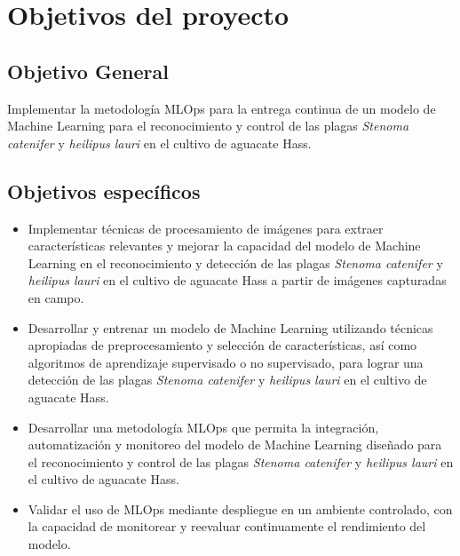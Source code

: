 \section{Objetivos del proyecto}

\subsection{Objetivo General}
Implementar la metodología MLOps para la entrega continua de un modelo de Machine Learning para el reconocimiento y control de las plagas \textit{Stenoma catenifer} y \textit{heilipus lauri} en el cultivo de aguacate Hass.




\subsection{Objetivos específicos}
\begin{itemize}
  \item Implementar técnicas de procesamiento de imágenes para extraer características relevantes y mejorar la capacidad del modelo de Machine Learning en el reconocimiento y detección de las plagas \textit{Stenoma catenifer} y \textit{heilipus lauri} en el cultivo de aguacate Hass a partir de imágenes capturadas en campo.
  \item Desarrollar y entrenar un modelo de Machine Learning utilizando técnicas apropiadas de preprocesamiento y selección de características, así como algoritmos de aprendizaje supervisado o no supervisado, para lograr una detección de las plagas \textit{Stenoma catenifer} y \textit{heilipus lauri} en el cultivo de aguacate Hass.
  \item Desarrollar una metodología MLOps que permita la integración, automatización y monitoreo del modelo de Machine Learning diseñado para el reconocimiento y control de las plagas \textit{Stenoma catenifer} y \textit{heilipus lauri} en el cultivo de aguacate Hass.
  \item Validar el uso de MLOps mediante despliegue en un ambiente controlado, con la capacidad de monitorear y reevaluar continuamente el rendimiento del modelo.  
\end{itemize}

\newpage
